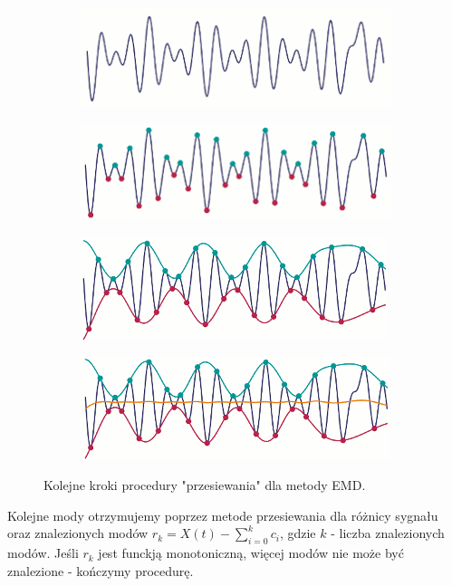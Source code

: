 \begin{figure} [H]
	\centering
	\begin{subfigure}{.48\textwidth}
		\centering
		\includegraphics[width=1.0\linewidth]{EDMIIssues/Figures/emd1.png}
	\end{subfigure}
	\begin{subfigure}{.48\textwidth}
		\centering
		\includegraphics[width=1.0\linewidth]{EDMIIssues/Figures/emd2.png}
	\end{subfigure}
	\begin{subfigure}{.48\textwidth}
		\centering
		\includegraphics[width=1.0\linewidth]{EDMIIssues/Figures/emd3.png}
	\end{subfigure}
	\begin{subfigure}{.48\textwidth}
		\centering
		\includegraphics[width=1.0\linewidth]{EDMIIssues/Figures/emd4.png}
	\end{subfigure}
	\caption{Kolejne kroki procedury "przesiewania" dla metody EMD.}
	\label{emd}
\end{figure}

Kolejne mody otrzymujemy poprzez metode przesiewania dla różnicy sygnału oraz znalezionych modów $ r_{k} = X(t) - \sum_{i=0}^{k} c_i $, gdzie $ k $ - liczba znalezionych modów. Jeśli $ r_k $ jest funckją monotoniczną, więcej modów nie może być znalezione - kończymy procedurę.